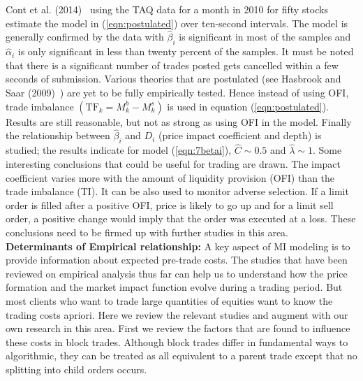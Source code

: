 Cont et al. (2014)~\cite{contkulst} using the TAQ data for a month in 2010 for fifty stocks estimate the model in (\ref{eqn:postulated}) over ten-second intervals. The model is generally confirmed by the data with $\hat{\beta}_i$ is significant in most of the samples and $\hat{\alpha}_i$ is only significant in less than twenty percent of the samples. It must be noted that there is a significant number of trades posted gets cancelled within a few seconds of submission. Various theories that are postulated (see Hasbrook and Saar (2009)~\cite{habbrooksaar}) are yet to be fully empirically tested. Hence instead of using OFI, trade imbalance $(\text{TF}_k=M_k^b-M_k^s)$ is used in equation (\ref{eqn:postulated}). Results are still reasonable, but not as strong as using OFI in the model. Finally the relationship between $\hat{\beta}_i$ and $D_i$ (price impact coefficient and depth) is studied; the results indicate for model (\ref{eqn:7betai}), $\hat{C} \sim 0.5$ and $\hat{\lambda} \sim 1$. Some interesting conclusions that could be useful for trading are drawn. The impact coefficient varies more with the amount of liquidity provision (OFI) than the trade imbalance (TI). It can be also used to monitor adverse selection. If a limit order is filled after a positive OFI, price is likely to go up and for a limit sell order, a positive change would imply that the order was executed at a loss. These conclusions need to be firmed up with further studies in this area. \\


\noindent\textbf{Determinants of Empirical relationship:} A key aspect of MI modeling is to provide information about expected pre-trade costs. The studies that have been reviewed on empirical analysis thus far can help us to understand how the price formation and the market impact function evolve during a trading period. But most clients who want to trade large quantities of equities want to know the trading costs apriori. Here we review the relevant studies and augment with our own research in this area. First we review the factors that are found to influence these costs in block trades. Although block trades differ in fundamental ways to algorithmic, they can be treated as all equivalent to a parent trade except that no splitting into child orders occurs.


